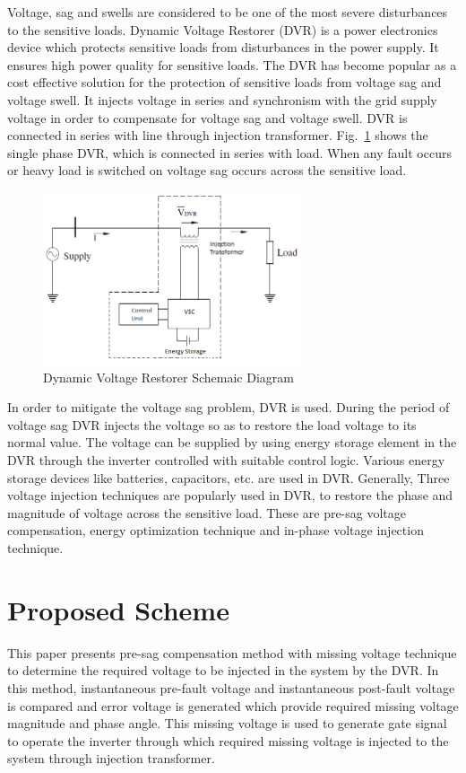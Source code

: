 \documentclass[journal,twoside]{IEEEtran}
\begin{document}
\bigskip
Voltage, sag and swells are considered to be one of the most severe disturbances to the sensitive loads. Dynamic Voltage Restorer (DVR) is a power electronics device which protects sensitive loads from disturbances in the power supply. It ensures high power quality for sensitive loads. The DVR has become popular as a cost effective solution for the protection of sensitive loads from voltage sag and voltage swell. It injects voltage in series and synchronism with the grid supply voltage in order to compensate for voltage sag and voltage swell. DVR is connected in series with line through injection transformer. Fig.~\ref{f1} shows the single phase DVR, which is connected in series with load. When any fault occurs or heavy load is switched on voltage sag occurs across the sensitive load.
\begin{figure}[!ht]
\centering
\includegraphics[width=3in]{1}
\caption{Dynamic Voltage Restorer Schemaic Diagram}
\label{f1}
\end{figure}
\bigskip
In order to mitigate the voltage sag problem, DVR is used. During the period of voltage sag DVR injects the voltage so as to restore the load voltage to its normal value. The voltage can be supplied by using energy
storage element in the DVR through the inverter controlled with suitable control logic. Various energy storage devices like batteries, capacitors, etc. are used in DVR. Generally, Three voltage injection techniques are popularly used in DVR, to restore the phase and magnitude of voltage across the sensitive load. These are pre-sag voltage compensation, energy optimization technique and in-phase voltage injection technique.



\section{Proposed Scheme}
This paper presents pre-sag compensation method with missing voltage technique to determine the required voltage to be injected in the system by the DVR. In this method, instantaneous pre-fault voltage and instantaneous post-fault voltage is compared and error voltage is generated which provide required missing voltage magnitude and phase angle. This missing voltage is used to generate gate signal to operate the inverter through which required missing voltage is injected to the system through injection transformer. 
\end{document}
